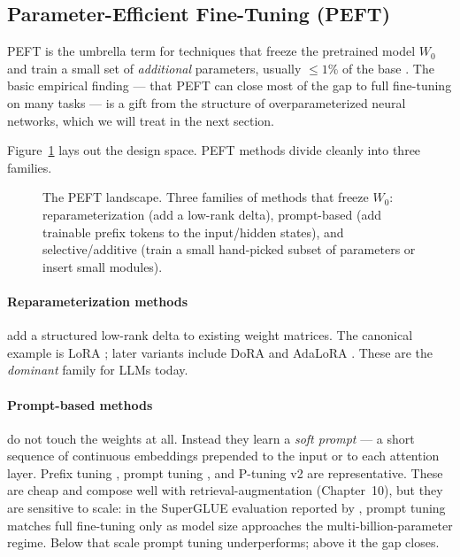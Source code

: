 \subsection{Parameter-Efficient Fine-Tuning (PEFT)}

PEFT is the umbrella term for techniques that freeze the pretrained
model $W_0$ and train a small set of \emph{additional} parameters,
usually $\leq 1\%$ of the base \citep{lialin2023peftsurvey}.
The basic empirical finding --- that PEFT can close most of the gap to
full fine-tuning on many tasks --- is a gift from the structure of
overparameterized neural networks, which we will treat in the next
section.

Figure~\ref{fig:peft-landscape} lays out the design space. PEFT
methods divide cleanly into three families.

\begin{figure}[ht]
  \centering
  
  \caption{The PEFT landscape. Three families of methods that freeze
  $W_0$: reparameterization (add a low-rank delta), prompt-based (add
  trainable prefix tokens to the input/hidden states), and
  selective/additive (train a small hand-picked subset of parameters
  or insert small modules).}
  \label{fig:peft-landscape}
\end{figure}

\paragraph{Reparameterization methods} add a structured low-rank delta
to existing weight matrices. The canonical example is LoRA
\citep{hu2021lora}; later variants include DoRA \citep{liu2024dora}
and AdaLoRA \citep{zhang2023adalora}. These are the \emph{dominant}
family for LLMs today.

\paragraph{Prompt-based methods} do not touch the weights at all.
Instead they learn a \emph{soft prompt} --- a short sequence of
continuous embeddings prepended to the input or to each attention
layer. Prefix tuning \citep{li2021prefix}, prompt tuning
\citep{lester2021prompt}, and P-tuning v2 \citep{liu2022ptuningv2} are
representative. These are cheap and compose well with
retrieval-augmentation (Chapter~10), but they are sensitive to scale:
in the SuperGLUE evaluation reported by \citet{lester2021prompt},
prompt tuning matches full fine-tuning only as model size
approaches the multi-billion-parameter regime. Below that scale
prompt tuning underperforms; above it the gap closes.

